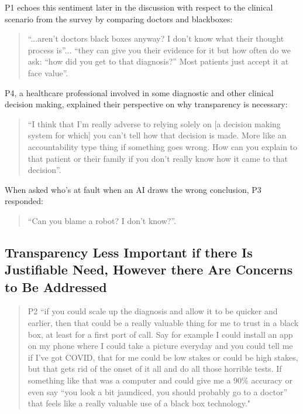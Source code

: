 \documentclass[manuscript,screen,review]{acmart}
\begin{document}
P1 echoes this sentiment later in the discussion with respect to the clinical scenario from the survey by comparing doctors and blackboxes: 

\begin{quote}
“...aren’t doctors black boxes anyway? I don’t know what their thought process is”... “they can give you their evidence for it but how often do we ask: “how did you get to that diagnosis?” Most patients just accept it at face value”. 
\end{quote}

P4, a healthcare professional involved in some diagnostic and other clinical decision making, explained their perspective on why transparency is necessary:

\begin{quote}
“I think that I'm really adverse to relying solely on [a decision making system for which] you can't tell how that decision is made. More like an accountability type thing if something goes wrong. How can you explain to that patient or their family if you don’t really know how it came to that decision”. 
\end{quote}

When asked who’s at fault when an AI draws the wrong conclusion, P3 responded:

\begin{quote}
“Can you blame a robot? I don’t know?”.
\end{quote}

\subsection{Transparency Less Important if there Is Justifiable Need, However there Are Concerns to Be Addressed}

\begin{quote}
P2 “if you could scale up the diagnosis and allow it to be quicker and earlier, then that could be a really valuable thing for me to trust in a black box, at least for a first port of call. Say for example I could install an app on my phone where I could take a picture everyday and you could tell me if I've got COVID, that for me could be low stakes or could be high stakes, but that gets rid of the onset of it all and do all those horrible tests. If something like that was a computer and could give me a 90\% accuracy or even say “you look a bit jaundiced, you should probably go to a doctor” that feels like a really valuable use of a black box technology."
\end{quote}
\end{document}
